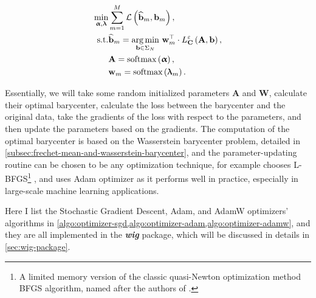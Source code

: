 \begin{equation}\label{eqn:wasserstein-dictionary-problem-unconstrained}
  \begin{aligned}
    \min_{\boldsymbol\upalpha, \boldsymbol\uplambda}
     &
    \sum_{m = 1}^M \mathcal{L} \left(\widehat{\mathbf{b}}_m, \mathbf{b}_m\right),             \\
    \text{s.t.}
     & \widehat{\mathbf{b}}_m =
    \operatorname*{arg\,min}_{\mathbf{b} \in \Sigma_N}\,
    \mathbf{w}_{m}^\top \cdot L_{\mathbf{C}}^\varepsilon \left(\mathbf{A}, \mathbf{b}\right), \\
     & \mathbf{A} = \text{softmax} \left(\boldsymbol\upalpha\right),                          \\
     & \mathbf{w}_m = \text{softmax} \left(\boldsymbol\uplambda_m\right).
  \end{aligned}
\end{equation}


Essentially, we will take some random initialized parameters $\mathbf{A}$ and $\mathbf{W}$,
calculate their optimal barycenter,
calculate the loss between the barycenter and the original data,
take the gradients of the loss with respect to the parameters,
and then update the parameters based on the gradients.
The computation of the optimal barycenter is based on the Wasserstein barycenter problem,
detailed in \cref{subsec:frechet-mean-and-wasserstein-barycenter},
and the parameter-updating routine can be chosen to be any optimization technique,
for example \citet{schmitz2018} chooses L-BFGS\footnote{
  A limited memory version of the classic quasi-Newton optimization method BFGS algorithm,
  named after the authors of \citet{broyden1970,fletcher1970,goldfarb1970,shanno1970}.
} \citep{liu1989},
and \citet{xie2020} uses Adam \citep{kingma2015} optimizer as it performs well in practice,
especially in large-scale machine learning applications.



Here I list the Stochastic Gradient Descent, Adam, and AdamW optimizers' algorithms
in \cref{algo:optimizer-sgd,algo:optimizer-adam,algo:optimizer-adamw},
and they are all implemented in the \textit{\textbf{wig}} package,
which will be discussed in details in \cref{sec:wig-package}.


